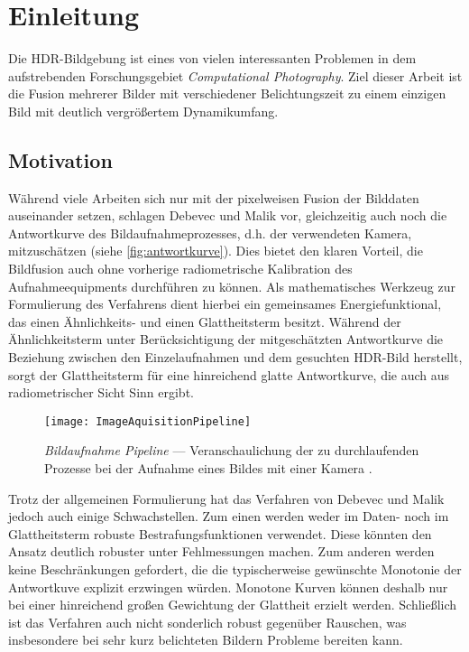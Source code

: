 \chapter{Einleitung}
Die \gls{HDR}-Bildgebung ist eines von vielen interessanten Problemen in dem aufstrebenden Forschungsgebiet \textit{Computational Photography}. Ziel dieser Arbeit ist die Fusion mehrerer Bilder mit verschiedener Belichtungszeit zu einem einzigen Bild mit deutlich vergrößertem Dynamikumfang.
 
\section{Motivation}


Während viele Arbeiten sich nur mit der pixelweisen Fusion der Bilddaten auseinander setzen, schlagen Debevec und Malik \cite{paper} vor, gleichzeitig auch noch die Antwortkurve des Bildaufnahmeprozesses, d.h. der verwendeten Kamera, mitzuschätzen (siehe \autoref{fig:antwortkurve}). Dies bietet den klaren Vorteil, die Bildfusion auch ohne vorherige radiometrische Kalibration des Aufnahmeequipments durchführen zu können. Als mathematisches Werkzeug zur Formulierung des Verfahrens dient hierbei ein gemeinsames Energiefunktional, das einen Ähnlichkeits- und einen  Glattheitsterm besitzt. Während der Ähnlichkeitsterm unter Berücksichtigung der mitgeschätzten Antwortkurve die Beziehung zwischen den Einzelaufnahmen und dem gesuchten HDR-Bild herstellt, sorgt der Glattheitsterm für eine hinreichend glatte Antwortkurve, die auch aus radiometrischer Sicht Sinn ergibt.

\begin{figure}
  \begin{center}
    \texttt{[image: ImageAquisitionPipeline]}
    \caption{\textit{Bildaufnahme Pipeline} --- Veranschaulichung der zu durchlaufenden Prozesse bei der Aufnahme eines Bildes mit einer Kamera  \cite[S.2]{paper}.}
    \label{fig:antwortkurve}
  \end{center}
\end{figure}

Trotz der allgemeinen Formulierung hat das Verfahren von Debevec und Malik jedoch auch einige Schwachstellen. Zum einen werden weder im Daten- noch im Glattheitsterm robuste Bestrafungsfunktionen verwendet. Diese könnten den Ansatz deutlich robuster unter Fehlmessungen machen. Zum anderen werden keine Beschränkungen gefordert, die die typischerweise gewünschte Monotonie der Antwortkuve explizit erzwingen würden. Monotone Kurven können deshalb nur bei einer hinreichend großen Gewichtung der Glattheit erzielt werden. Schließlich ist das Verfahren auch nicht sonderlich robust gegenüber Rauschen, was insbesondere bei sehr kurz belichteten Bildern Probleme bereiten kann. 

